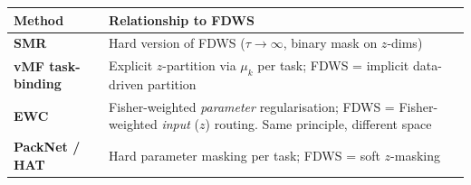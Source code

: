 \documentclass[11pt]{article}
\begin{document}
\begin{center}
\begin{tabular}{lp{10cm}}
\toprule
Method & Relationship to FDWS \\
\midrule
\textbf{SMR} & Hard version of FDWS ($\tau \to \infty$, binary mask on $z$-dims) \\
\textbf{vMF task-binding} & Explicit $z$-partition via $\mu_k$ per task; FDWS = implicit data-driven partition \\
\textbf{EWC} & Fisher-weighted \emph{parameter} regularisation; FDWS = Fisher-weighted \emph{input} ($z$) routing. Same principle, different space \\
\textbf{PackNet / HAT} & Hard parameter masking per task; FDWS = soft $z$-masking \\
\bottomrule
\end{tabular}
\end{center}
\end{document}
